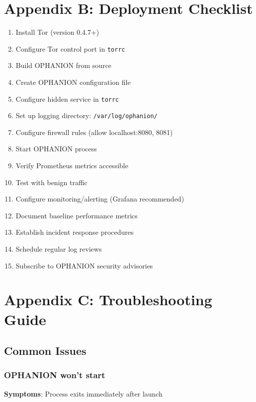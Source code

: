 \documentclass[11pt,a4paper]{article}
\begin{document}
\section{Appendix B: Deployment Checklist}

\begin{enumerate}
\item[$\square$] Install Tor (version 0.4.7+)
\item[$\square$] Configure Tor control port in \texttt{torrc}
\item[$\square$] Build OPHANION from source
\item[$\square$] Create OPHANION configuration file
\item[$\square$] Configure hidden service in \texttt{torrc}
\item[$\square$] Set up logging directory: \texttt{/var/log/ophanion/}
\item[$\square$] Configure firewall rules (allow localhost:8080, 8081)
\item[$\square$] Start OPHANION process
\item[$\square$] Verify Prometheus metrics accessible
\item[$\square$] Test with benign traffic
\item[$\square$] Configure monitoring/alerting (Grafana recommended)
\item[$\square$] Document baseline performance metrics
\item[$\square$] Establish incident response procedures
\item[$\square$] Schedule regular log reviews
\item[$\square$] Subscribe to OPHANION security advisories
\end{enumerate}

\section{Appendix C: Troubleshooting Guide}

\subsection{Common Issues}

\subsubsection{OPHANION won't start}

\textbf{Symptoms}: Process exits immediately after launch
\end{document}
